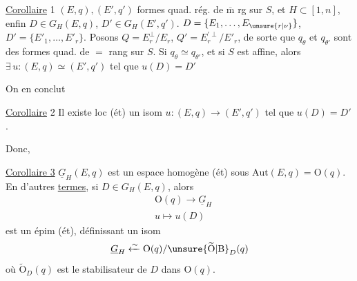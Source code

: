 \uline{Corollaire} 1  $(E,q),(E',q')$ formes quad. rég. de $\overline{\mathrm m}$ rg  sur $S$,  et $H\subset[1,n]$, enfin $D\in G_H(E,q)$, $D'\in G_H(E',q')$.  $D=\{E_1,\ldots,E_{\unsure{r|\nu}}\}$, $D'=\{E'_1,\ldots,E'_r\}$.  Posons $Q=E_r^\perp/E_r$, $Q'=E_r^{\prime\perp}/E'_r$, de sorte que $q_\theta$ et $q_{\theta'}$ sont des formes quad. de $=$ rang sur $S$. Si $q_\theta\simeq q_{\theta'}$,  et si $S$ est affine, alors  $\exists\,u:(E,q)\simeq(E',q')$ tel que $u(D)=D'$

On en conclut

\uline{Corollaire} 2 Il existe loc (ét) un isom $u:(E,q)\longrightarrow(E',q')$ tel que $u(D)=D'$.

Donc,

\uline{Corollaire 3} $\underline G_H(E,q)$ est un espace homogène (ét) sous $\mathrm{Aut}(E,q)=\mathrm O(q)$. En d'autres \uline{termes}, si $D\in G_H(E,q)$, alors
\[
\begin{aligned}
&\mathrm O(q)\longrightarrow\underline G_H\\
&u\longmapsto u(D)
\end{aligned}
\]
est un épim (ét),  définissant un isom
\[
\underline G_H\xleftarrow{\sim}\mathrm O(q)/\unsure{\widetilde{\mathrm O}|\mathrm B}_{D}(q)
\]
où $\widetilde{\mathrm O}_{D}(q)$ est le stabilisateur de $D$ dans $\mathrm O(q)$.
